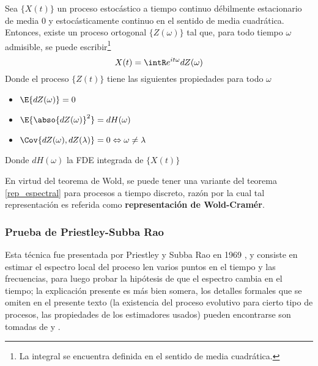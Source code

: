 \newpage

\begin{thrm}
Sea $\{X(t)\}$ un proceso estoc\'astico a tiempo continuo d\'ebilmente estacionario de media 0 y 
estoc\'asticamente continuo en el sentido de media cuadr\'atica. Entonces, existe un proceso 
ortogonal $\{Z(\omega)\}$ tal que, para todo tiempo $\omega$ admisible, se puede 
escribir\footnote{La integral se encuentra definida en el sentido de media cuadr\'atica.}
\begin{equation*}
X(t) = \intR e^{i t \omega} dZ(\omega)
\end{equation*}
Donde el proceso $\{Z(t)\}$ tiene las siguientes propiedades para todo $\omega$
\begin{itemize}
\item $\E{dZ(\omega)} = 0$
\item $\E{\abso{dZ(\omega)}^{2}} = dH(\omega)$
\item $\Cov{dZ(\omega),dZ(\lambda)} = 0 \Leftrightarrow \omega \neq \lambda$
\end{itemize}
Donde $dH(\omega)$ la FDE integrada de $\{X(t)\}$
\label{rep_espectral}
\end{thrm}

En virtud del teorema de Wold, se puede tener una variante del teorema \ref{rep_espectral}
para procesos a tiempo discreto, raz\'on por la cual  
tal representaci\'on es referida como \textbf{representaci\'on de Wold-Cram\'er}.


\subsubsection{Prueba de Priestley-Subba Rao}

Esta t\'ecnica fue presentada por Priestley y Subba Rao en 1969 \cite{Priestley69}, y consiste en 
estimar el espectro local del proceso len varios puntos en el tiempo y las frecuencias, para luego 
probar la hip\'otesis de que el espectro cambia en el tiempo; la explicaci\'on presente es m\'as 
bien somera, los detalles formales que se omiten en el presente texto (la existencia del proceso 
evolutivo para cierto tipo de procesos, las propiedades de los estimadores usados) pueden 
encontrarse son tomadas de \cite{Priestley65} y \cite{Priestley66}.

